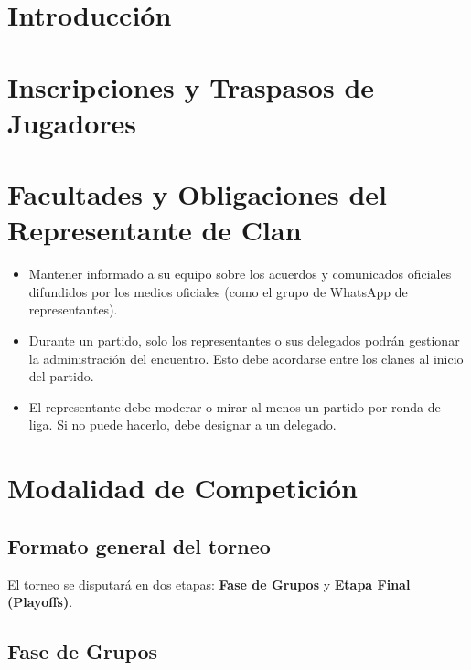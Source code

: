 \documentclass[a4paper, 11pt]{article}
\begin{document}
    
    \section{Introducción}
    

    \clearpage

    \section{Inscripciones y Traspasos de Jugadores}
    

    \clearpage

    \section{Facultades y Obligaciones del Representante de Clan}
    
    \begin{itemize}
        \item Mantener informado a su equipo sobre los acuerdos y comunicados oficiales difundidos por los medios oficiales (como el grupo de WhatsApp de representantes).
        \item Durante un partido, solo los representantes o sus delegados podrán gestionar la administración del encuentro. Esto debe acordarse entre los clanes al inicio del partido.
        \item El representante debe moderar o mirar al menos un partido por ronda de liga. Si no puede hacerlo, debe designar a un delegado.
    \end{itemize}

    \clearpage

    \section{Modalidad de Competición}

    \subsection{Formato general del torneo}

    El torneo se disputará en dos etapas: \textbf{Fase de Grupos} y \textbf{Etapa Final (Playoffs)}.

    \subsection{Fase de Grupos}
\end{document}
